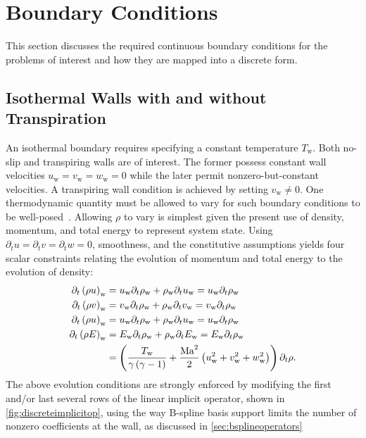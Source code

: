 \section{Boundary Conditions}

This section discusses the required continuous boundary conditions for the
problems of interest and how they are mapped into a discrete form.

\subsection{Isothermal Walls with and without Transpiration}

An isothermal boundary requires specifying a constant temperature
$T_\mathrm{w}$.  Both no-slip and transpiring walls are of interest.  The former
possess constant wall velocities $u_\mathrm{w} = v_\mathrm{w} = w_\mathrm{w} =
0$ while the later permit nonzero-but-constant velocities.  A transpiring wall
condition is achieved by setting $v_\mathrm{w} \neq 0$.  One thermodynamic
quantity must be allowed to vary for such boundary conditions to be
well-posed~\citep{Poinsot1992Boundary}.
Allowing $\rho$ to vary is simplest given the present use of density,
momentum, and total energy to represent system state.  Using $\partial_t u =
\partial_t v = \partial_t w = 0$, smoothness, and the constitutive assumptions
yields four scalar constraints relating the evolution of momentum and total
energy to the evolution of density:
\begin{subequations}
\label{eq:isothermalwallconstraint}
\begin{align}
   \partial_t \left(\rho u\right)_\mathrm{w}
&= u_\mathrm{w} \partial_t \rho_\mathrm{w} + \rho_\mathrm{w} \partial_t u_\mathrm{w}
 = u_\mathrm{w} \partial_t \rho_\mathrm{w}
\\
   \partial_t \left(\rho v\right)_\mathrm{w}
&= v_\mathrm{w} \partial_t \rho_\mathrm{w} + \rho_\mathrm{w} \partial_t v_\mathrm{w}
 = v_\mathrm{w} \partial_t \rho_\mathrm{w}
\\
   \partial_t \left(\rho u\right)_\mathrm{w}
&= u_\mathrm{w} \partial_t \rho_\mathrm{w} + \rho_\mathrm{w} \partial_t u_\mathrm{w}
 = u_\mathrm{w} \partial_t \rho_\mathrm{w}
\\\notag
   \partial_t \left(\rho E\right)_\mathrm{w}
&= E_\mathrm{w} \partial_t \rho_\mathrm{w} + \rho_\mathrm{w} \partial_t E_\mathrm{w}
 = E_\mathrm{w} \partial_t \rho_\mathrm{w}
\notag\\
&= \left(
     \frac{T_\mathrm{w}}{\gamma\left(\gamma-1\right)}
   + \frac{\mbox{Ma}_{}^2}{2}\left(u_\mathrm{w}^2+v_\mathrm{w}^2+w_\mathrm{w}^2\right)
   \right) \partial_{t} \rho.
\end{align}
\end{subequations}
The above evolution conditions are strongly enforced by modifying the first
and/or last several rows of the linear implicit operator, shown in
\autoref{fig:discreteimplicitop}, using the way B-spline basis support limits the
number of nonzero coefficients at the wall, as discussed in
\autoref{sec:bsplineoperators}


